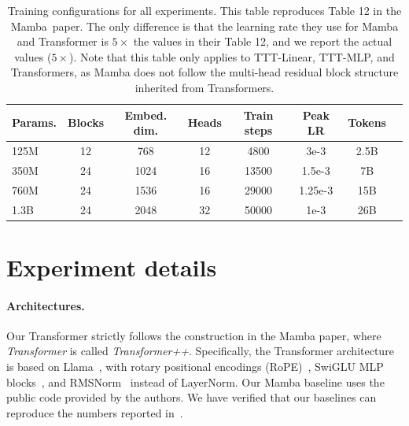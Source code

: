 \documentclass{article}
\begin{document}
\renewcommand{\arraystretch}{1.5}
\begin{table}
\centering
\begin{tabular}{lccccccc}
\toprule
Params. & Blocks & Embed. dim. & Heads & Train steps & Peak LR & Tokens \\
\midrule
125M & 12 & 768 & 12 & 4800 & 3e-3 & 2.5B \\
350M & 24 & 1024 & 16 & 13500 & 1.5e-3 & 7B \\
760M & 24 & 1536 & 16 & 29000 & 1.25e-3 & 15B \\
1.3B & 24 & 2048 & 32 & 50000 & 1e-3 & 26B \\
\bottomrule
\end{tabular}
\caption{Training configurations for all experiments. This table reproduces Table 12 in the \mbox{Mamba paper.}
The only difference is that the learning rate they use for Mamba and Transformer is $5\times$ the values in their Table 12, and we report the actual values ($5\times$).
Note that this table only applies to TTT-Linear, TTT-MLP, and Transformers, as Mamba does not follow the multi-head residual block structure inherited from Transformers.
}
\label{tab:configs}
\end{table}

\section{Experiment details}
\label{app:details}
\paragraph{Architectures.}
Our Transformer strictly follows the construction in the Mamba paper, where \emph{Transformer} is called \emph{Transformer++}.
Specifically, the Transformer architecture is based on Llama~\cite{touvron2023llama}, with rotary positional encodings (RoPE)~\cite{su2023roformer}, SwiGLU MLP blocks~\cite{shazeer2020glu}, and RMSNorm~\cite{zhang2019root} instead of LayerNorm.
Our Mamba baseline uses the public code provided by the authors.
We have verified that our baselines can reproduce the numbers reported in~\cite{gu2023mamba}.
\end{document}
